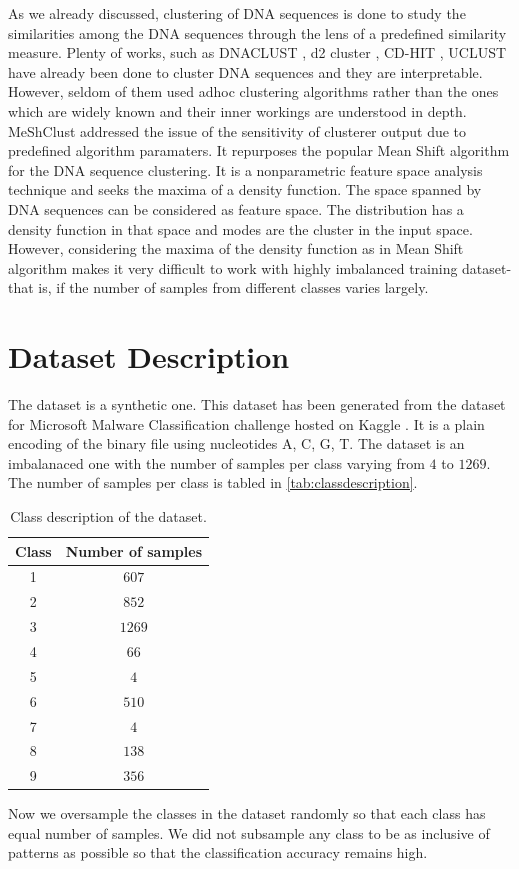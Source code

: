 \documentclass[oneside, twocolumn, a4paper, 10pt]{IEEEtran}
\begin{document}
\par
As we already discussed, clustering of DNA sequences is done to study the similarities among the DNA sequences through the lens of a predefined similarity measure. Plenty of works, such as DNACLUST \cite{11}, d2 cluster \cite{12}, CD-HIT \cite{13}, UCLUST \cite{14} have already been done to cluster DNA sequences and they are interpretable. However, seldom of them used adhoc clustering algorithms rather than the ones which are widely known and their inner workings are understood in depth. MeShClust \cite{15} addressed the issue of the sensitivity of clusterer output due to predefined algorithm paramaters. It repurposes the popular Mean Shift algorithm \cite{16} for the DNA sequence clustering. It is a nonparametric feature space analysis technique and seeks the maxima of a density function. The space spanned by DNA sequences can be considered as feature space. The distribution has a density function in that space and modes are the cluster in the input space. However, considering the maxima of the density function as in Mean Shift algorithm makes it very difficult to work with highly imbalanced training dataset- that is, if the number of samples from different classes varies largely.
\section{Dataset Description}
The dataset is a synthetic one. This dataset has been generated from the dataset for Microsoft Malware Classification challenge hosted on Kaggle \cite{21}. It is a plain encoding of the binary file using nucleotides A, C, G, T. The dataset is an imbalanaced one with the number of samples per class varying from $4$ to $1269$. The number of samples per class is tabled in \autoref{tab:classdescription}. 
\begin{table}
\begin{center}
\begin{tabular}{|c|c|}
\hline
Class & Number of samples\\ \hline
1 & $607$\\ \hline
2 & $852$\\ \hline
3 & $1269$\\ \hline
4 & $66$\\ \hline
5 & $4$\\ \hline
6 & $510$\\ \hline
7 & $4$\\ \hline
8 & $138$\\ \hline
9 & $356$\\ \hline
\end{tabular}
\caption{Class description of the dataset.}
\label{tab:classdescription}
\end{center}
\end{table}
Now we oversample the classes in the dataset randomly so that each class has equal number of samples. We did not subsample any class to be as inclusive of patterns as possible so that the classification accuracy remains high.
\end{document}
